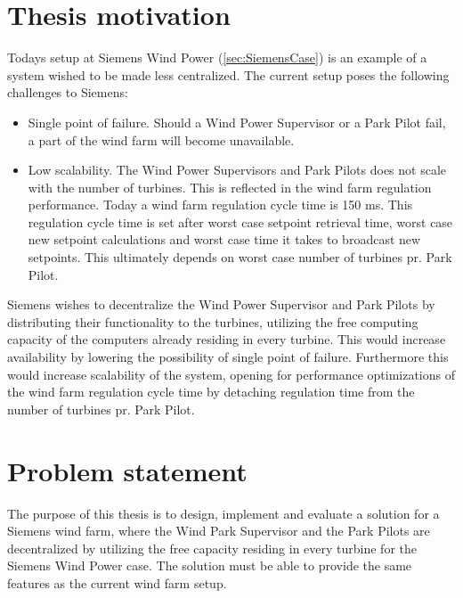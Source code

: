 \section{Thesis motivation}
\label{sec:ThesisMotivation}
Todays setup at Siemens Wind Power (\cref{sec:SiemensCase}) is an example of a system wished to be made less centralized. The current setup poses the following challenges to Siemens:  

\begin{itemize} 
	\item Single point of failure. Should a Wind Power Supervisor or a Park Pilot fail, a part of the wind farm will become unavailable.
	\item Low scalability. The Wind Power Supervisors and Park Pilots does not scale with the number of turbines. This is reflected in the wind farm regulation performance. Today a wind farm regulation cycle time is 150 ms. This regulation cycle time is set after worst case setpoint retrieval time, worst case new setpoint calculations and worst case time it takes to broadcast new setpoints. This ultimately depends on worst case number of turbines pr. Park Pilot.
\end{itemize}

Siemens wishes to decentralize the Wind Power Supervisor and Park Pilots by distributing their functionality to the turbines, utilizing the free computing capacity of the computers already residing in every turbine. This would increase availability by lowering the possibility of single point of failure. Furthermore this would increase scalability of the system, opening for performance optimizations of the wind farm regulation cycle time by detaching regulation time from the number of turbines pr. Park Pilot. 

\section{Problem statement}
\label{sec:problemStatement}

The purpose of this thesis is to design, implement and evaluate a solution for a Siemens wind farm, where the Wind Park Supervisor and the Park Pilots are decentralized by utilizing the free capacity residing in every turbine for the Siemens Wind Power case. The solution must be able to provide the same features as the current wind farm setup. 

